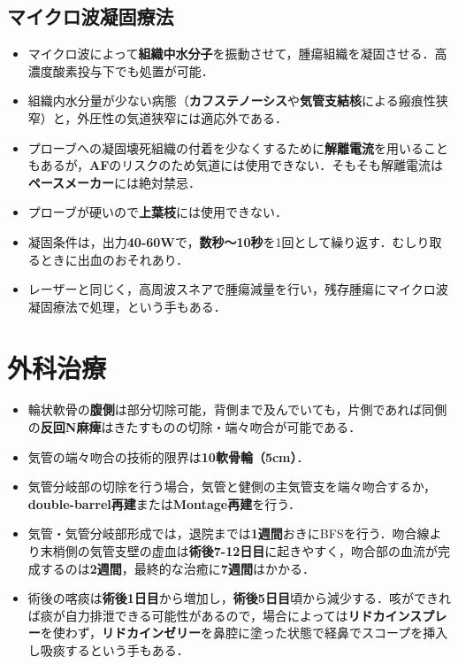 \subsection{マイクロ波凝固療法}
\begin{itemize}

\item マイクロ波によって\textbf{組織中水分子}を振動させて，腫瘍組織を凝固させる．高濃度酸素投与下でも処置が可能．
\item 組織内水分量が少ない病態（\textbf{カフステノーシス}や\textbf{気管支結核}による瘢痕性狭窄）と，外圧性の気道狭窄には適応外である．
\item プローブへの凝固壊死組織の付着を少なくするために\textbf{解離電流}を用いることもあるが，\textbf{AF}のリスクのため気道には使用できない．そもそも解離電流は\textbf{ペースメーカー}には絶対禁忌．
\item プローブが硬いので\textbf{上葉枝}には使用できない．
\item 凝固条件は，出力\textbf{40-60W}で，\textbf{数秒〜10秒}を1回として繰り返す．むしり取るときに出血のおそれあり．
\item レーザーと同じく，高周波スネアで腫瘍減量を行い，残存腫瘍にマイクロ波凝固療法で処理，という手もある．

\end{itemize}

\section{外科治療}

\begin{itemize}

\item 輪状軟骨の\textbf{腹側}は部分切除可能，背側まで及んでいても，片側であれば同側の\textbf{反回N麻痺}はきたすものの切除・端々吻合が可能である．
\item 気管の端々吻合の技術的限界は\textbf{10軟骨輪（5cm）}．
\item 気管分岐部の切除を行う場合，気管と健側の主気管支を端々吻合するか，\textbf{double-barrel再建}または\textbf{Montage再建}を行う．
\item 気管・気管分岐部形成では，退院までは\textbf{1週間}おきにBFSを行う．吻合線より末梢側の気管支壁の虚血は\textbf{術後7-12日目}に起きやすく，吻合部の血流が完成するのは\textbf{2週間}，最終的な治癒に\textbf{7週間}はかかる．
\item 術後の喀痰は\textbf{術後1日目}から増加し，\textbf{術後5日目}頃から減少する．咳ができれば痰が自力排泄できる可能性があるので，場合によっては\textbf{リドカインスプレー}を使わず，\textbf{リドカインゼリー}を鼻腔に塗った状態で経鼻でスコープを挿入し吸痰するという手もある．

\end{itemize}



